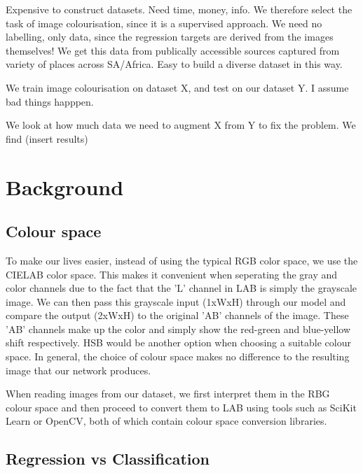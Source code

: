 \documentclass[conference]{IEEEtran}
\begin{document}
Expensive to construct datasets. Need time, money, info.
We therefore select the task of image colourisation, since it is a supervised approach. We need no labelling, only data, since the regression targets are derived from the images themselves!
We get this data from publically accessible sources captured from variety of places across SA/Africa. 
Easy to build a diverse dataset in this way. 

We train image colourisation on dataset X, and test on our dataset Y.  I assume bad things happpen.

We look at how much data we need to augment X from Y to fix the problem. We find (insert results) 

\section{Background}




\subsection{Colour space}

To make our lives easier, instead of using the typical RGB color space, we use the CIELAB color space. This makes it convenient when seperating the gray and color channels due to the fact that the 'L' channel in LAB is simply the grayscale image. We can then pass this grayscale input (1xWxH) through our model and compare the output (2xWxH) to the original 'AB' channels of the image. These 'AB' channels make up the color and simply show the red-green and blue-yellow shift respectively. HSB would be another option when choosing a suitable colour space. In general, the choice of colour space makes no difference to the resulting image that our network produces.

When reading images from our dataset, we first interpret them in the RBG colour space and then proceed to convert them to LAB using tools such as SciKit Learn or OpenCV, both of which contain colour space conversion libraries. 

\subsection{Regression vs Classification}
\end{document}

